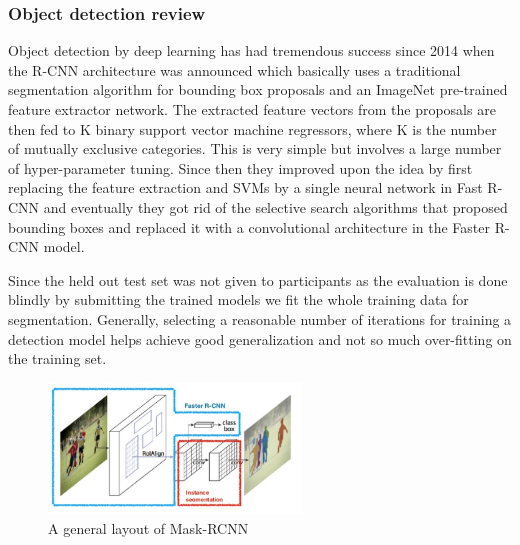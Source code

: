 \documentclass[a4paper,12pt]{article}
\begin{document}
\subsubsection{Object detection review}

\par Object detection by deep learning has had tremendous success since 2014 when the R-CNN \cite{girshick2014rich} architecture was announced which basically uses a traditional segmentation algorithm for bounding box proposals and an ImageNet pre-trained feature extractor network. The extracted feature vectors from the proposals are then fed to K binary support vector machine regressors, where K is the number of mutually exclusive categories. This is very simple but involves a large number of hyper-parameter tuning. Since then they improved upon the idea by first replacing the feature extraction and SVMs by a single neural network in Fast R-CNN \cite{girshick2015fast} and eventually they got rid of the selective search algorithms that proposed bounding boxes and replaced it with a convolutional architecture in the Faster R-CNN \cite{ren2015faster} model.

\vspace{4mm}

\par Since the held out test set was not given to participants as the evaluation is done blindly by submitting the trained models we fit the whole training data for segmentation. Generally, selecting a reasonable number of iterations for training a detection model helps achieve good generalization and not so much over-fitting on the training set.

\vspace{4mm}

\begin{figure}[H]
    \centering
    \includegraphics[width=0.6\textwidth]{ra/maskrcnn.jpg}
    \caption{A general layout of Mask-RCNN}
    \label{fig:mask-rcnn}
\end{figure}

\vspace{4mm}
\end{document}
